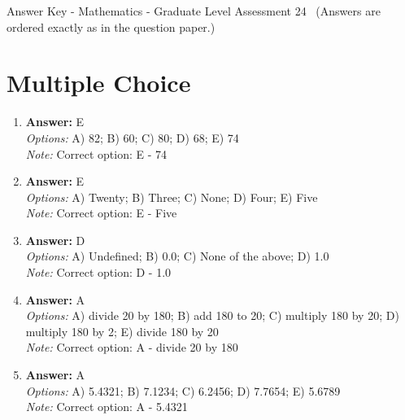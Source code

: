 \documentclass[12pt]{article}
\begin{document}
\begin{center}
Answer Key - Mathematics - Graduate Level Assessment 24 \
\small (Answers are ordered exactly as in the question paper.)
\end{center}

\section*{Multiple Choice}
\begin{enumerate}[label=\arabic*.]
\item \textbf{Answer:} E
\\ \textit{Options:} A) 82; B) 60; C) 80; D) 68; E) 74
\\ \textit{Note:} Correct option: E - 74
\item \textbf{Answer:} E
\\ \textit{Options:} A) Twenty; B) Three; C) None; D) Four; E) Five
\\ \textit{Note:} Correct option: E - Five
\item \textbf{Answer:} D
\\ \textit{Options:} A) Undefined; B) 0.0; C) None of the above; D) 1.0
\\ \textit{Note:} Correct option: D - 1.0
\item \textbf{Answer:} A
\\ \textit{Options:} A) divide 20 by 180; B) add 180 to 20; C) multiply 180 by 20; D) multiply 180 by 2; E) divide 180 by 20
\\ \textit{Note:} Correct option: A - divide 20 by 180
\item \textbf{Answer:} A
\\ \textit{Options:} A) 5.4321; B) 7.1234; C) 6.2456; D) 7.7654; E) 5.6789
\\ \textit{Note:} Correct option: A - 5.4321
\end{enumerate}
\end{document}
